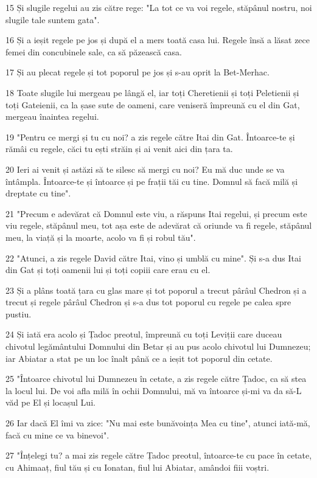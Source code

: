 \par 15 Și slugile regelui au zis către rege: "La tot ce va voi regele, stăpânul nostru, noi slugile tale suntem gata".
\par 16 Și a ieșit regele pe jos și după el a mers toată casa lui. Regele însă a lăsat zece femei din concubinele sale, ca să păzească casa.
\par 17 Și au plecat regele și tot poporul pe jos și s-au oprit la Bet-Merhac.
\par 18 Toate slugile lui mergeau pe lângă el, iar toți Cheretienii și toți Peletienii și toți Gateienii, ca la șase sute de oameni, care veniseră împreună cu el din Gat, mergeau înaintea regelui.
\par 19 "Pentru ce mergi și tu cu noi? a zis regele către Itai din Gat. Întoarce-te și rămâi cu regele, căci tu ești străin și ai venit aici din țara ta.
\par 20 Ieri ai venit și astăzi să te silesc să mergi cu noi? Eu mă duc unde se va întâmpla. Întoarce-te și întoarce și pe frații tăi cu tine. Domnul să facă milă și dreptate cu tine".
\par 21 "Precum e adevărat că Domnul este viu, a răspuns Itai regelui, și precum este viu regele, stăpânul meu, tot așa este de adevărat că oriunde va fi regele, stăpânul meu, la viață și la moarte, acolo va fi și robul tău".
\par 22 "Atunci, a zis regele David către Itai, vino și umblă cu mine". Și s-a dus Itai din Gat și toți oamenii lui și toți copiii care erau cu el.
\par 23 Și a plâns toată țara cu glas mare și tot poporul a trecut pârâul Chedron și a trecut și regele pârâul Chedron și s-a dus tot poporul cu regele pe calea spre pustiu.
\par 24 Și iată era acolo și Țadoc preotul, împreună cu toți Leviții care duceau chivotul legământului Domnului din Betar și au pus acolo chivotul lui Dumnezeu; iar Abiatar a stat pe un loc înalt până ce a ieșit tot poporul din cetate.
\par 25 "Întoarce chivotul lui Dumnezeu în cetate, a zis regele către Țadoc, ca să stea la locul lui. De voi afla milă în ochii Domnului, mă va întoarce și-mi va da să-L văd pe El și locașul Lui.
\par 26 Iar dacă El îmi va zice: "Nu mai este bunăvoința Mea cu tine", atunci iată-mă, facă cu mine ce va binevoi".
\par 27 "Înțelegi tu? a mai zis regele către Țadoc preotul, întoarce-te cu pace în cetate, cu Ahimaaț, fiul tău și cu Ionatan, fiul lui Abiatar, amândoi fiii voștri.
